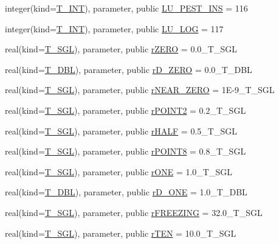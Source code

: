 \begin{DoxyCompactItemize}
integer(kind=\hyperlink{namespacetest_a6f91ebd89b58cfcc5da99faed9385c1e}{T\_\-INT}), parameter, public \hyperlink{namespacetest_a0796d8d42c3fd32614b1f4ac37aa21cf}{LU\_\-PEST\_\-INS} = 116
\item 
integer(kind=\hyperlink{namespacetest_a6f91ebd89b58cfcc5da99faed9385c1e}{T\_\-INT}), parameter, public \hyperlink{namespacetest_a6f591abb1742ac7c55e5146938c8d81f}{LU\_\-LOG} = 117
\item 
real(kind=\hyperlink{namespacetest_a04d8b9090502de3a00046fe904bc3d99}{T\_\-SGL}), parameter, public \hyperlink{namespacetest_a9bd8aefd97474e9bd8eb52d36c5d1ea2}{rZERO} = 0.0\_\-T\_\-SGL
\item 
real(kind=\hyperlink{namespacetest_af379b935264d350d76bf75331181e241}{T\_\-DBL}), parameter, public \hyperlink{namespacetest_a4bd8ceae51c320c4ba797c783a5421a9}{rD\_\-ZERO} = 0.0\_\-T\_\-DBL
\item 
real(kind=\hyperlink{namespacetest_a04d8b9090502de3a00046fe904bc3d99}{T\_\-SGL}), parameter, public \hyperlink{namespacetest_ad2e23effbad4134a648b3e3694400190}{rNEAR\_\-ZERO} = 1E-\/9\_\-T\_\-SGL
\item 
real(kind=\hyperlink{namespacetest_a04d8b9090502de3a00046fe904bc3d99}{T\_\-SGL}), parameter, public \hyperlink{namespacetest_af379bbc7038181ce0aee8712e76e9867}{rPOINT2} = 0.2\_\-T\_\-SGL
\item 
real(kind=\hyperlink{namespacetest_a04d8b9090502de3a00046fe904bc3d99}{T\_\-SGL}), parameter, public \hyperlink{namespacetest_a25c0227adf96fbd382b9cbac9600ba44}{rHALF} = 0.5\_\-T\_\-SGL
\item 
real(kind=\hyperlink{namespacetest_a04d8b9090502de3a00046fe904bc3d99}{T\_\-SGL}), parameter, public \hyperlink{namespacetest_a52a9cf25cf2fc8828b5313923217c3d8}{rPOINT8} = 0.8\_\-T\_\-SGL
\item 
real(kind=\hyperlink{namespacetest_a04d8b9090502de3a00046fe904bc3d99}{T\_\-SGL}), parameter, public \hyperlink{namespacetest_a884b235687921d6a1682ba733422bc2a}{rONE} = 1.0\_\-T\_\-SGL
\item 
real(kind=\hyperlink{namespacetest_af379b935264d350d76bf75331181e241}{T\_\-DBL}), parameter, public \hyperlink{namespacetest_a0677b58c46e425be305a3733296635ad}{rD\_\-ONE} = 1.0\_\-T\_\-DBL
\item 
real(kind=\hyperlink{namespacetest_a04d8b9090502de3a00046fe904bc3d99}{T\_\-SGL}), parameter, public \hyperlink{namespacetest_a31db6c3796f52bf10cc407ec22ba3e80}{rFREEZING} = 32.0\_\-T\_\-SGL
\item 
real(kind=\hyperlink{namespacetest_a04d8b9090502de3a00046fe904bc3d99}{T\_\-SGL}), parameter, public \hyperlink{namespacetest_a797e128f57e419a939928fd813fa5ef6}{rTEN} = 10.0\_\-T\_\-SGL

\end{DoxyCompactItemize}

